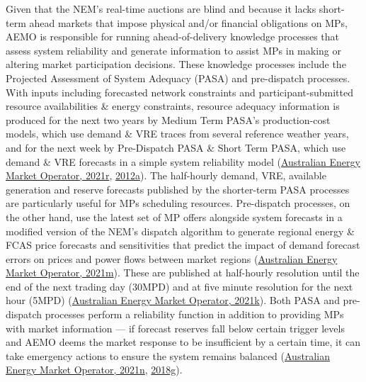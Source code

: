 \documentclass[12pt,a4paper,]{report}
\begin{document}
Given that the NEM's real-time auctions are blind and because it lacks
short-term ahead markets that impose physical and/or financial
obligations on MPs, AEMO is responsible for running ahead-of-delivery
knowledge processes that assess system reliability and generate
information to assist MPs in making or altering market participation
decisions. These knowledge processes include the Projected Assessment of
System Adequacy (PASA) and pre-dispatch processes. With inputs including
forecasted network constraints and participant-submitted resource
availabilities \& energy constraints, resource adequacy information is
produced for the next two years by Medium Term PASA's production-cost
models, which use demand \& VRE traces from several reference weather
years, and for the next week by Pre-Dispatch PASA \& Short Term PASA,
which use demand \& VRE forecasts in a simple system reliability model
(\protect\hyperlink{ref-australianenergymarketoperatorMediumTermPASA2021}{Australian
Energy Market Operator, 2021r},
\protect\hyperlink{ref-australianenergymarketoperatorShortTermPASA2012}{2012a}).
The half-hourly demand, VRE, available generation and reserve forecasts
published by the shorter-term PASA processes are particularly useful for
MPs scheduling resources. Pre-dispatch processes, on the other hand, use
the latest set of MP offers alongside system forecasts in a modified
version of the NEM's dispatch algorithm to generate regional energy \&
FCAS price forecasts and sensitivities that predict the impact of demand
forecast errors on prices and power flows between market regions
(\protect\hyperlink{ref-australianenergymarketoperatorPreDispatchSensitivities2021}{Australian
Energy Market Operator, 2021m}). These are published at half-hourly
resolution until the end of the next trading day (30MPD) and at five
minute resolution for the next hour (5MPD)
(\protect\hyperlink{ref-australianenergymarketoperatorPredispatchOperatingProcedure2021}{Australian
Energy Market Operator, 2021k}). Both PASA and pre-dispatch processes
perform a reliability function in addition to providing MPs with market
information --- if forecast reserves fall below certain trigger levels
and AEMO deems the market response to be insufficient by a certain time,
it can take emergency actions to ensure the system remains balanced
(\protect\hyperlink{ref-australianenergymarketoperatorShortTermReserve2021}{Australian
Energy Market Operator, 2021n},
\protect\hyperlink{ref-australianenergymarketoperatorReserveLevelDeclaration2018}{2018g}).
\end{document}
